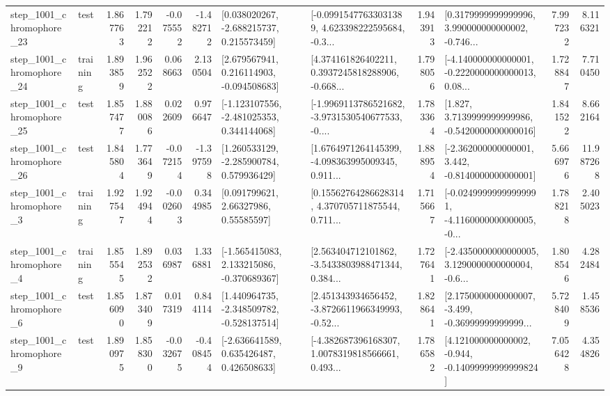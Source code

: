 \begin{tabular}{llrrrrllrlrr}
 step\_1001\_chromophore\_23 &      test &      1.867763 &    1.792212 &     -0.075552 & -1.482712 &    [0.038020267, -2.688215737, 0.215573459] &  [-0.09915477633031389, 4.623398222595684, -0.3... &       1.943913 &  [0.3179999999999996, 3.990000000000002, -0.746... &            7.997232 &          8.116321 \\
 step\_1001\_chromophore\_24 &  training &      1.893859 &    1.962522 &      0.068663 &  2.130504 &    [2.679567941, 0.216114903, -0.094508683] &  [4.374161826402211, 0.3937245818288906, -0.668... &       1.798056 &  [-4.140000000000001, -0.2220000000000013, 0.08... &            1.728847 &          7.710450 \\
 step\_1001\_chromophore\_25 &      test &      1.857477 &    1.880086 &      0.022609 &  0.976647 &   [-1.123107556, -2.481025353, 0.344144068] &  [-1.9969113786521682, -3.9731530540677533, -0.... &       1.783364 &   [1.827, 3.7139999999999986, -0.5420000000000016] &            1.841522 &          8.662164 \\
 step\_1001\_chromophore\_26 &      test &      1.845804 &    1.773649 &     -0.072154 & -1.397598 &    [1.260533129, -2.285900784, 0.579936429] &  [1.6764971264145399, -4.098363995009345, 0.911... &       1.888954 &   [-2.362000000000001, 3.442, -0.8140000000000001] &            5.666976 &         11.987268 \\
  step\_1001\_chromophore\_3 &  training &      1.927547 &    1.924944 &     -0.002603 &  0.344985 &       [0.091799621, 2.66327986, 0.55585597] &  [0.15562764286628314, 4.370705711875544, 0.711... &       1.715667 &  [-0.02499999999999991, -4.1160000000000005, -0... &            1.788218 &          2.405023 \\
  step\_1001\_chromophore\_4 &  training &      1.855545 &    1.892532 &      0.036987 &  1.336881 &   [-1.565415083, 2.133215086, -0.370689367] &  [2.563404712101862, -3.5433803988471344, 0.384... &       1.727641 &  [-2.4350000000000005, 3.1290000000000004, -0.6... &            1.808546 &          4.282484 \\
  step\_1001\_chromophore\_6 &      test &      1.856090 &    1.873409 &      0.017319 &  0.844114 &   [1.440964735, -2.348509782, -0.528137514] &  [2.451343934656452, -3.8726611966349993, -0.52... &       1.828641 &  [2.1750000000000007, -3.499, -0.36999999999999... &            5.728409 &          1.458536 \\
  step\_1001\_chromophore\_9 &      test &      1.890975 &    1.858300 &     -0.032675 & -0.408454 &    [-2.636641589, 0.635426487, 0.426508633] &  [-4.382687396168307, 1.0078319818566661, 0.493... &       1.786582 &  [4.121000000000002, -0.944, -0.14099999999999824] &            7.056428 &          4.354826 \\

\end{tabular}
